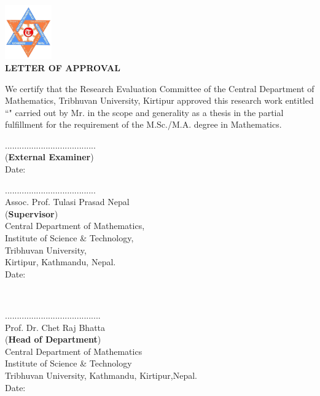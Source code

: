 
 \begin{center}
 	\includegraphics[width=0.15\textwidth]{pictures/tulogo.png}\\[1.5cm]
 {\Large{\bfseries{LETTER OF APPROVAL}}}\\[.5cm]
\end{center}

\noindent
We certify that the Research Evaluation Committee of the Central Department of Mathematics, Tribhuvan University, Kirtipur approved this research work entitled ``\textbf{\thetitle}" carried out by Mr. \textbf{\theauthor} in the scope and generality as a thesis in the partial fulfillment for the requirement of the M.Sc./M.A. degree in Mathematics.
\\[3.5cm]
\begin{minipage}[b]{0.45\textwidth}
		......................................\\[2mm]


                (\textbf{External Examiner})\\
		Date:
\end{minipage}
%
\begin{minipage}{0.6\textwidth}
	        ......................................\\
		Assoc. Prof. Tulasi Prasad Nepal \\
		(\textbf{Supervisor}) \\
		Central Department of Mathematics,\\
                Institute of Science \& Technology,\\
                Tribhuvan University,\\
                Kirtipur, Kathmandu, Nepal.\\[0.1cm]
		Date: \thedate

\end{minipage}\\[3cm]

\begin{center}
........................................\\
Prof. Dr. Chet Raj Bhatta\\
	(\textbf{Head of Department})\\
 Central Department of Mathematics\\
	 Institute of Science \& Technology\\
	 Tribhuvan University, Kathmandu,
	 Kirtipur,Nepal.\\
	Date: \thedate
\end{center}
